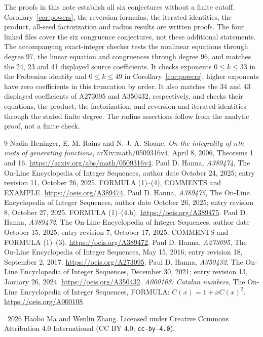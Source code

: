 \documentclass[11pt]{article}
\begin{document}
The proofs in this note establish all six conjectures without a finite
cutoff. Corollary~\ref{cor:powers}, the reversion formulas, the iterated
identities, the product, all-seed factorization and radius results are
written proofs. The four linked files cover the six congruence
conjectures, not these additional statements.
The accompanying exact-integer checker tests the nonlinear equations through
degree 97, the linear equation and congruences through degree 96, and matches
the 24, 23 and 41 displayed source coefficients.
It checks exponents $0\le k\le33$ in the Frobenius identity and
$0\le k\le49$ in Corollary~\ref{cor:powers}; higher exponents have
zero coefficients in this truncation by order.
It also matches the 34 and 43 displayed coefficients of A273095 and
A350432, respectively, and checks their equations, the product,
the factorization, and reversion and iterated identities through the
stated finite degree. The radius assertions follow from the analytic
proof, not a finite check.

\begingroup\small
\begin{thebibliography}{9}
 Nadia Heninger, E. M. Rains and N. J. A. Sloane,
\emph{On the integrality of $n$th roots of generating functions},
arXiv:math/0509316v4, April 8, 2006, Theorems 1 and 16.
\url{https://arxiv.org/abs/math/0509316v4}.
 Paul D. Hanna, \emph{A389474}, The On-Line Encyclopedia of
Integer Sequences, author date October 24, 2025; entry revision 11,
October 26, 2025. FORMULA (1)--(4), COMMENTS and EXAMPLE.
\url{https://oeis.org/A389474}.
 Paul D. Hanna, \emph{A389475}, The On-Line Encyclopedia of
Integer Sequences, author date October 26, 2025; entry revision 8,
October 27, 2025. FORMULA (1)--(4.b).
\url{https://oeis.org/A389475}.
 Paul D. Hanna, \emph{A389472}, The On-Line Encyclopedia of
Integer Sequences, author date October 15, 2025; entry revision 7,
October 17, 2025. COMMENTS and FORMULA (1)--(3).
\url{https://oeis.org/A389472}.
 Paul D. Hanna, \emph{A273095}, The On-Line Encyclopedia of
Integer Sequences, May 15, 2016; entry revision 18, September 2, 2017.
\url{https://oeis.org/A273095}.
 Paul D. Hanna, \emph{A350432}, The On-Line Encyclopedia of
Integer Sequences, December 30, 2021; entry revision 13, January 26, 2024.
\url{https://oeis.org/A350432}.
 \emph{A000108: Catalan numbers}, The On-Line Encyclopedia
of Integer Sequences, FORMULA: $C(x)=1+xC(x)^2$.
\url{https://oeis.org/A000108}.
\end{thebibliography}
\endgroup

\noindent\small\textcopyright\ 2026 Haobo Ma and Wenlin Zhang.
Licensed under Creative Commons Attribution 4.0 International
(CC BY 4.0; \texttt{cc-by-4.0}).
\end{document}

